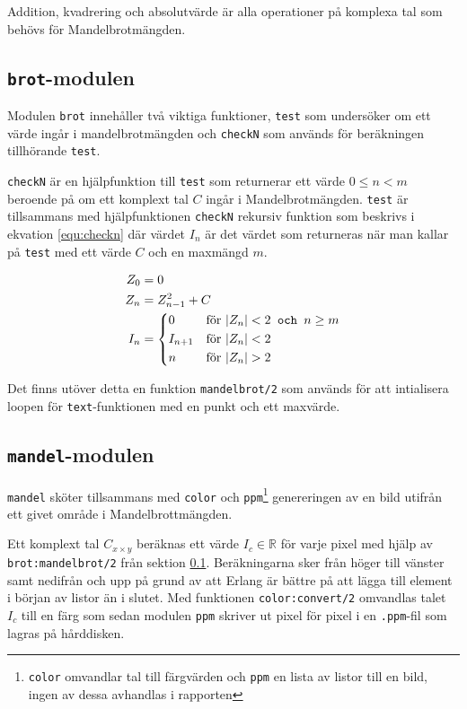 \documentclass[a4paper, 11pt]{article}
\begin{document}
Addition, kvadrering och absolutvärde är alla operationer på komplexa tal som behövs för Mandelbrotmängden.

\subsection{\texttt{brot}-modulen}
\label{subsec:brot}
Modulen \texttt{brot} innehåller två viktiga funktioner, \texttt{test} som undersöker om ett värde ingår i mandelbrotmängden och \texttt{checkN} som används för beräkningen tillhörande \texttt{test}.

\texttt{checkN} är en hjälpfunktion till \texttt{test} som returnerar ett värde $0 \leq n < m$ beroende på om ett komplext tal $C$ ingår i Mandelbrotmängden. \texttt{test} är tillsammans med hjälpfunktionen \texttt{checkN} rekursiv funktion som beskrivs i ekvation \ref{equ:checkn} där värdet $I_n$ är det värdet som returneras när man kallar på \texttt{test} med ett värde $C$ och en maxmängd $m$.

\begin{subequations}\label{equ:checkn}
\begin{align}
Z_{0} &= 0\\
Z_{n} &= Z_{n-1}^2 + C\\
I_n &= \begin{dcases}
	0 & \text{för } |Z_n| < 2 \texttt{ och } n \geq m\\
	I_{n+1} & \text{för } |Z_n| < 2\\
	n & \text{för } |Z_n| > 2\\
\end{dcases}
\end{align}
\end{subequations}

Det finns utöver detta en funktion \texttt{mandelbrot/2} som används för att intialisera loopen för \texttt{text}-funktionen med en punkt och ett maxvärde.

\subsection{\texttt{mandel}-modulen}

\texttt{mandel} sköter tillsammans med \texttt{color} och \texttt{ppm}\footnote{\texttt{color} omvandlar tal till färgvärden och \texttt{ppm} en lista av listor till en bild, ingen av dessa avhandlas i rapporten} genereringen av en bild utifrån ett givet område i Mandelbrottmängden.

Ett komplext tal $C_{x\times y}$ beräknas ett värde $I_c \in \mathbb{R}$ för varje pixel med hjälp av \texttt{brot:mandelbrot/2} från sektion \ref{subsec:brot}. Beräkningarna sker från höger till vänster samt nedifrån och upp på grund av att Erlang är bättre på att lägga till element i början av listor än i slutet. Med funktionen \texttt{color:convert/2} omvandlas talet $I_c$ till en färg som sedan modulen \texttt{ppm} skriver ut pixel för pixel i en \texttt{.ppm}-fil som lagras på hårddisken.
\end{document}
